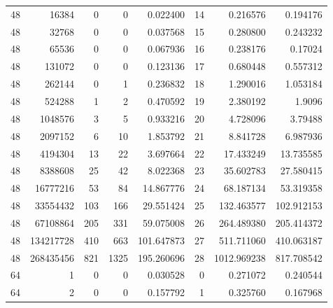 \begin{longtable}[c]{@{}rrrrrrrr@{}}
    48        & 16384     & 0         & 0        & 0.022400    & 14                  & 0.216576    & 0.194176   \\
    48        & 32768     & 0         & 0        & 0.037568    & 15                  & 0.280800    & 0.243232   \\
    48        & 65536     & 0         & 0        & 0.067936    & 16                  & 0.238176    & 0.17024    \\
    48        & 131072    & 0         & 0        & 0.123136    & 17                  & 0.680448    & 0.557312   \\
    48        & 262144    & 0         & 1        & 0.236832    & 18                  & 1.290016    & 1.053184   \\
    48        & 524288    & 1         & 2        & 0.470592    & 19                  & 2.380192    & 1.9096     \\
    48        & 1048576   & 3         & 5        & 0.933216    & 20                  & 4.728096    & 3.79488    \\
    48        & 2097152   & 6         & 10       & 1.853792    & 21                  & 8.841728    & 6.987936   \\
    48        & 4194304   & 13        & 22       & 3.697664    & 22                  & 17.433249   & 13.735585  \\
    48        & 8388608   & 25        & 42       & 8.022368    & 23                  & 35.602783   & 27.580415  \\
    48        & 16777216  & 53        & 84       & 14.867776   & 24                  & 68.187134   & 53.319358  \\
    48        & 33554432  & 103       & 166      & 29.551424   & 25                  & 132.463577  & 102.912153 \\
    48        & 67108864  & 205       & 331      & 59.075008   & 26                  & 264.489380  & 205.414372 \\
    48        & 134217728 & 410       & 663      & 101.647873  & 27                  & 511.711060  & 410.063187 \\
    48        & 268435456 & 821       & 1325     & 195.260696  & 28                  & 1012.969238 & 817.708542 \\
    64        & 1         & 0         & 0        & 0.030528    & 0                   & 0.271072    & 0.240544   \\
    64        & 2         & 0         & 0        & 0.157792    & 1                   & 0.325760    & 0.167968   \\

\end{longtable}
